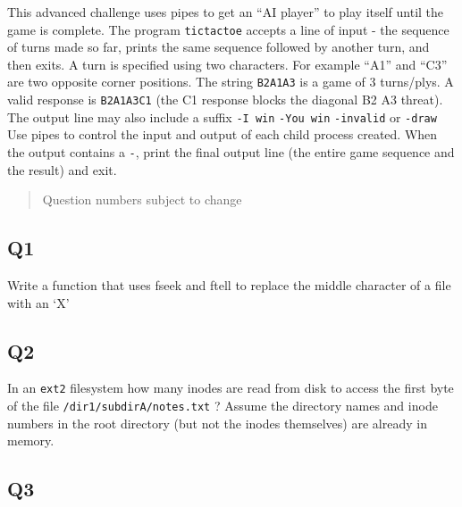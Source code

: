 This advanced challenge uses pipes to get an ``AI player'' to play
itself until the game is complete. The program \texttt{tictactoe}
accepts a line of input - the sequence of turns made so far, prints the
same sequence followed by another turn, and then exits. A turn is
specified using two characters. For example ``A1'' and ``C3'' are two
opposite corner positions. The string \texttt{B2A1A3} is a game of 3
turns/plys. A valid response is \texttt{B2A1A3C1} (the C1 response
blocks the diagonal B2 A3 threat). The output line may also include a
suffix \texttt{-I\ win} \texttt{-You\ win} \texttt{-invalid} or
\texttt{-draw} Use pipes to control the input and output of each child
process created. When the output contains a \texttt{-}, print the final
output line (the entire game sequence and the result) and exit.

\begin{quote}
Question numbers subject to change
\end{quote}

\subsection{Q1}\label{q1-4}

Write a function that uses fseek and ftell to replace the middle
character of a file with an `X'

\begin{Shaded}
\begin{Highlighting}[]
 
  


\NormalTok{\}}
\end{Highlighting}
\end{Shaded}

\subsection{Q2}\label{q2-4}

In an \texttt{ext2} filesystem how many inodes are read from disk to
access the first byte of the file \texttt{/dir1/subdirA/notes.txt} ?
Assume the directory names and inode numbers in the root directory (but
not the inodes themselves) are already in memory.

\subsection{Q3}\label{q3-3}

